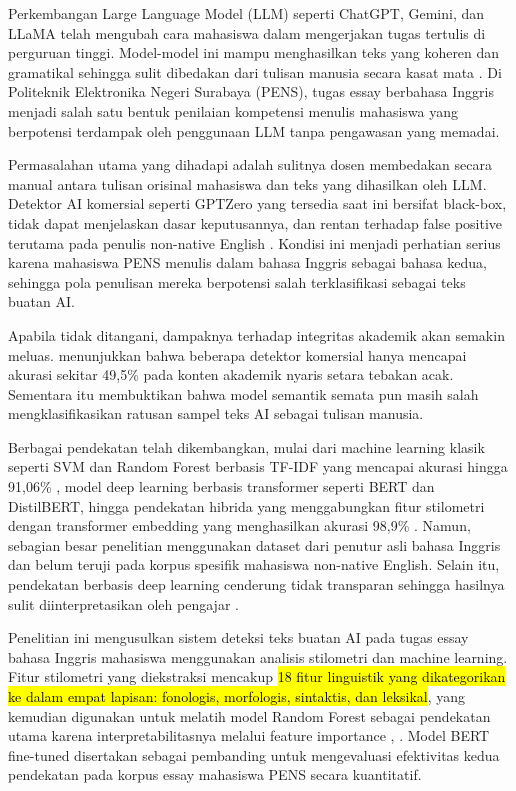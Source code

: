 Perkembangan Large Language Model (LLM) seperti ChatGPT, Gemini, dan LLaMA telah mengubah cara mahasiswa dalam mengerjakan tugas tertulis di perguruan tinggi. Model-model ini mampu menghasilkan teks yang koheren dan gramatikal sehingga sulit dibedakan dari tulisan manusia secara kasat mata \cite{Farrell2026}. Di Politeknik Elektronika Negeri Surabaya (PENS), tugas essay berbahasa Inggris menjadi salah satu bentuk penilaian kompetensi menulis mahasiswa yang berpotensi terdampak oleh penggunaan LLM tanpa pengawasan yang memadai.
\par Permasalahan utama yang dihadapi adalah sulitnya dosen membedakan secara manual antara tulisan orisinal mahasiswa dan teks yang dihasilkan oleh LLM. Detektor AI komersial seperti GPTZero yang tersedia saat ini bersifat black-box, tidak dapat menjelaskan dasar keputusannya, dan rentan terhadap false positive terutama pada penulis non-native English \cite{Jin2027}. Kondisi ini menjadi perhatian serius karena mahasiswa PENS menulis dalam bahasa Inggris sebagai bahasa kedua, sehingga pola penulisan mereka berpotensi salah terklasifikasi sebagai teks buatan AI.
\par Apabila tidak ditangani, dampaknya terhadap integritas akademik akan semakin meluas. \cite{Alhijawi2026} menunjukkan bahwa beberapa detektor komersial hanya mencapai akurasi sekitar 49,5\% pada konten akademik nyaris setara tebakan acak. Sementara itu \cite{Farrell2026} membuktikan bahwa model semantik semata pun masih salah mengklasifikasikan ratusan sampel teks AI sebagai tulisan manusia.
\par Berbagai pendekatan telah dikembangkan, mulai dari machine learning klasik seperti SVM dan Random Forest berbasis TF-IDF yang mencapai akurasi hingga 91,06\% \cite{H2025}, model deep learning berbasis transformer seperti BERT dan DistilBERT, hingga pendekatan hibrida yang menggabungkan fitur stilometri dengan transformer embedding yang menghasilkan akurasi 98,9\% \cite{Farrell2026}. Namun, sebagian besar penelitian menggunakan dataset dari penutur asli bahasa Inggris dan belum teruji pada korpus spesifik mahasiswa non-native English. Selain itu, pendekatan berbasis deep learning cenderung tidak transparan sehingga hasilnya sulit diinterpretasikan oleh pengajar \cite{Teja2025}. 
\par Penelitian ini mengusulkan sistem deteksi teks buatan AI pada tugas essay bahasa Inggris mahasiswa menggunakan analisis stilometri dan machine learning. Fitur stilometri yang diekstraksi mencakup \hl {18 fitur linguistik yang dikategorikan ke dalam empat lapisan: fonologis, morfologis, sintaktis, dan leksikal}, yang kemudian digunakan untuk melatih model Random Forest sebagai pendekatan utama karena interpretabilitasnya melalui feature importance \cite{Farrell2026}, \cite{Jin2027}. Model BERT fine-tuned disertakan sebagai pembanding untuk mengevaluasi efektivitas kedua pendekatan pada korpus essay mahasiswa PENS secara kuantitatif.

